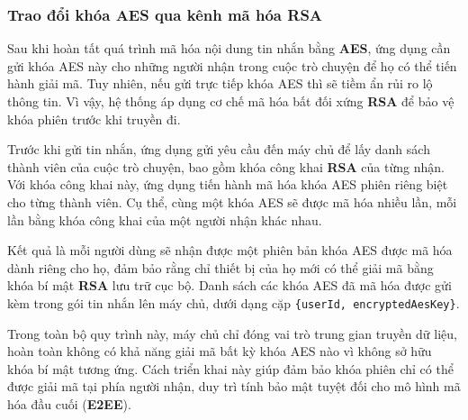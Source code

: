 \subsubsection{Trao đổi khóa AES qua kênh mã hóa RSA}
\indent Sau khi hoàn tất quá trình mã hóa nội dung tin nhắn bằng \textbf{AES}, ứng dụng cần gửi khóa AES này cho những người nhận trong cuộc trò chuyện để họ có thể tiến hành giải mã.  
Tuy nhiên, nếu gửi trực tiếp khóa AES thì sẽ tiềm ẩn rủi ro lộ thông tin. Vì vậy, hệ thống áp dụng cơ chế mã hóa bất đối xứng \textbf{RSA} để bảo vệ khóa phiên trước khi truyền đi.

\indent Trước khi gửi tin nhắn, ứng dụng gửi yêu cầu đến máy chủ để lấy danh sách thành viên của cuộc trò chuyện, bao gồm khóa công khai \textbf{RSA} của từng nhận.  
Với khóa công khai này, ứng dụng tiến hành mã hóa khóa AES phiên riêng biệt cho từng thành viên.  
Cụ thể, cùng một khóa AES sẽ được mã hóa nhiều lần, mỗi lần bằng khóa công khai của một người nhận khác nhau.

\indent Kết quả là mỗi người dùng sẽ nhận được một phiên bản khóa AES được mã hóa dành riêng cho họ, đảm bảo rằng chỉ thiết bị của họ mới có thể giải mã bằng khóa bí mật \textbf{RSA} lưu trữ cục bộ.  
Danh sách các khóa AES đã mã hóa được gửi kèm trong gói tin nhắn lên máy chủ, dưới dạng cặp \texttt{\{userId, encryptedAesKey\}}.

\indent Trong toàn bộ quy trình này, máy chủ chỉ đóng vai trò trung gian truyền dữ liệu, hoàn toàn không có khả năng giải mã bất kỳ khóa AES nào vì không sở hữu khóa bí mật tương ứng.  
Cách triển khai này giúp đảm bảo khóa phiên chỉ có thể được giải mã tại phía người nhận, duy trì tính bảo mật tuyệt đối cho mô hình mã hóa đầu cuối (\textbf{E2EE}).
